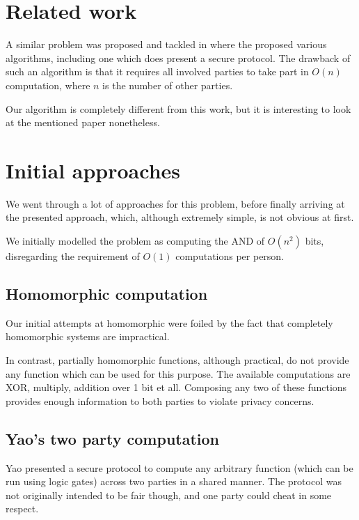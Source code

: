 \documentclass[sigtbd]{sigtbd-style}
\begin{document}
\section{Related work}
A similar problem was proposed and tackled in \cite{Senpai:1} where
the proposed various algorithms, including one which does present a
secure protocol. The drawback of such an algorithm is that it requires
all involved parties to take part in $O(n)$ computation, where $n$ is
the number of other parties.

Our algorithm is completely different from this work, but it is
interesting to look at the mentioned paper nonetheless.



\section{Initial approaches}
We went through a lot of approaches for this problem, before finally
arriving at the presented approach, which, although extremely simple,
is not obvious at first.

We initially modelled the problem as computing the AND of $O(n^2)$ bits,
disregarding the requirement of $O(1)$ computations per person.

\subsection{Homomorphic computation}

Our initial attempts at homomorphic were foiled by the fact that
completely homomorphic systems are impractical.

In contrast, partially homomorphic functions, although practical, do
not provide any function which can be used for this purpose. The
available computations are XOR, multiply, addition over 1 bit et
all. Composing any two of these functions provides enough information
to both parties to violate privacy concerns.

\subsection{Yao's two party computation}
Yao presented a secure protocol to compute any arbitrary function
(which can be run using logic gates) across two parties in a shared
manner. The protocol was not originally intended to be fair though,
and one party could cheat in some respect.
\end{document}
